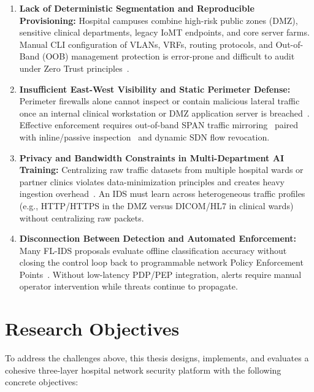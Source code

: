 \begin{enumerate}[leftmargin=1.8em, itemsep=6pt]
  \item \textbf{Lack of Deterministic Segmentation and Reproducible Provisioning:} Hospital campuses combine high-risk public zones (DMZ), sensitive clinical departments, legacy IoMT endpoints, and core server farms. Manual CLI configuration of VLANs, VRFs, routing protocols, and Out-of-Band (OOB) management protection is error-prone and difficult to audit under Zero Trust principles~\cite{ciscoHealthcareProfile}.
  \item \textbf{Insufficient East-West Visibility and Static Perimeter Defense:} Perimeter firewalls alone cannot inspect or contain malicious lateral traffic once an internal clinical workstation or DMZ application server is breached~\cite{rose2020zerotrust}. Effective enforcement requires out-of-band SPAN traffic mirroring~\cite{ciscoSpan} paired with inline/passive inspection~\cite{suricataIpsConcept,owasp2026crs} and dynamic SDN flow revocation.
  \item \textbf{Privacy and Bandwidth Constraints in Multi-Department AI Training:} Centralizing raw traffic datasets from multiple hospital wards or partner clinics violates data-minimization principles and creates heavy ingestion overhead~\cite{javeed2024federated,amiri2023sids}. An IDS must learn across heterogeneous traffic profiles (e.g., HTTP/HTTPS in the DMZ versus DICOM/HL7 in clinical wards) without centralizing raw packets.
  \item \textbf{Disconnection Between Detection and Automated Enforcement:} Many FL-IDS proposals evaluate offline classification accuracy without closing the control loop back to programmable network Policy Enforcement Points~\cite{xu2025zero,alanazi2026edgeguard}. Without low-latency PDP/PEP integration, alerts require manual operator intervention while threats continue to propagate.
\end{enumerate}

\section{Research Objectives}
\label{sec:objectives}

To address the challenges above, this thesis designs, implements, and evaluates a cohesive three-layer hospital network security platform with the following concrete objectives:

